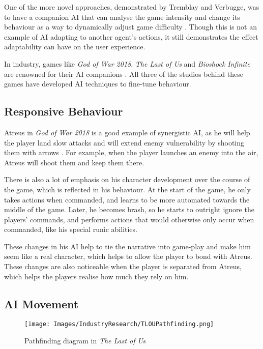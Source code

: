 \documentclass{IEEEtran}
\begin{document}
One of the more novel approaches, demonstrated by Tremblay and Verbugge, was to have a companion AI that can analyse the game intensity and change its behaviour as a way to dynamically adjust game difficulty \cite{tremblay2013adaptive}. Though this is not an example of AI adapting to another agent's actions, it still demonstrates the effect adaptability can have on the user experience.

In industry, games like \textit{God of War 2018}, \textit{The Last of Us} and \textit{Bioshock Infinite} are renowned for their AI companions \cite{PlayDontShow}. All three of the studios behind these games have developed AI techniques to fine-tune behaviour.

\subsection{Responsive Behaviour}
\label{Responsive Behaviour}

Atreus in \textit{God of War 2018} is a good example of synergistic AI, as he will help the player land slow attacks and will extend enemy vulnerability by shooting them with arrows \cite{GDCAtreus}. For example, when the player launches an enemy into the air, Atreus will shoot them and keep them there.

There is also a lot of emphasis on his character development over the course of the game, which is reflected in his behaviour. At the start of the game, he only takes actions when commanded, and learns to be more automated towards the middle of the game. Later, he becomes brash, so he starts to outright ignore the players’ commands, and performs actions that would otherwise only occur when commanded, like his special runic abilities.

These changes in his AI help to tie the narrative into game-play and make him seem like a real character, which helps to allow the player to bond with Atreus. These changes are also noticeable when the player is separated from Atreus, which helps the players realise how much they rely on him.


\subsection{AI Movement}
\label{Movement}

\begin{figure}
  \centering
  \texttt{[image: Images/IndustryResearch/TLOUPathfinding.png]}
  
\caption{Pathfinding diagram in \textit{The Last of Us}}
\label{fig:TLOUPathfinding}
\end{figure}
\end{document}
